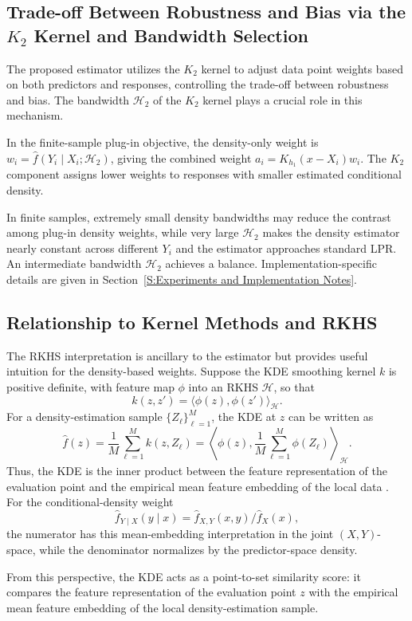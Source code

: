 \documentclass[preprint,1p,times,authoryear]{elsarticle}
\begin{document}
\subsection{Trade-off Between Robustness and Bias via the \texorpdfstring{\( K_2 \)}{K2} Kernel and Bandwidth Selection}
The proposed estimator utilizes the \( K_2 \) kernel to adjust data point weights based on both predictors and responses, controlling the trade-off between robustness and bias. The bandwidth \( \mathcal{H}_2 \) of the \( K_2 \) kernel plays a crucial role in this mechanism.

In the finite-sample plug-in objective, the density-only weight is \(w_i=\hat{f}(Y_i \mid X_i; \mathcal{H}_2)\), giving the combined weight \(a_i=K_{h_1}(x-X_i)w_i\). The \( K_2 \) component assigns lower weights to responses with smaller estimated conditional density.

In finite samples, extremely small density bandwidths may reduce the contrast among plug-in density weights, while very large \( \mathcal{H}_2 \) makes the density estimator nearly constant across different \( Y_i \) and the estimator approaches standard LPR. An intermediate bandwidth \( \mathcal{H}_2 \) achieves a balance. Implementation-specific details are given in Section~\ref{S:Experiments and Implementation Notes}.

\subsection{Relationship to Kernel Methods and RKHS}
The RKHS interpretation is ancillary to the estimator but provides useful intuition for the density-based weights. Suppose the KDE smoothing kernel \(k\) is positive definite, with feature map \(\phi\) into an RKHS \(\mathcal H\), so that
\[
k(z,z')=\langle \phi(z),\phi(z')\rangle_{\mathcal H}.
\]
For a density-estimation sample \(\{Z_\ell\}_{\ell=1}^{M}\), the KDE at \(z\) can be written as
\[
\hat f(z)
=
\frac{1}{M}\sum_{\ell=1}^{M} k(z,Z_\ell)
=
\left\langle
\phi(z),
\frac{1}{M}\sum_{\ell=1}^{M}\phi(Z_\ell)
\right\rangle_{\mathcal H}.
\]
Thus, the KDE is the inner product between the feature representation of the evaluation point and the empirical mean feature embedding of the local data \citep{Muandet2017}. For the conditional-density weight
\[
\hat f_{Y\mid X}(y\mid x)=\hat f_{X,Y}(x,y)/\hat f_X(x),
\]
the numerator has this mean-embedding interpretation in the joint \((X,Y)\)-space, while the denominator normalizes by the predictor-space density.

From this perspective, the KDE acts as a point-to-set similarity score: it compares the feature representation of the evaluation point \(z\) with the empirical mean feature embedding of the local density-estimation sample.
\end{document}
